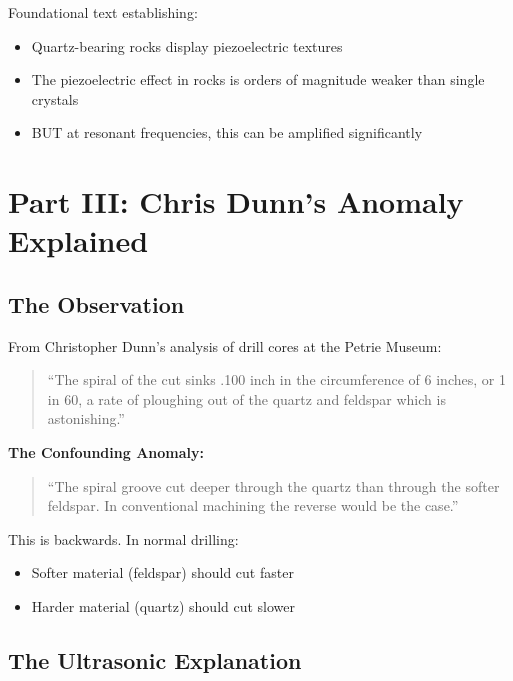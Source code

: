 \documentclass[11pt]{article}
\begin{document}
\subsubsection{\citet{Parkhomenko1971}}

Foundational text establishing:
\begin{itemize}
    \item Quartz-bearing rocks display piezoelectric textures
    \item The piezoelectric effect in rocks is orders of magnitude weaker than single crystals
    \item BUT at resonant frequencies, this can be amplified significantly
\end{itemize}

\section{Part III: Chris Dunn's Anomaly Explained}

\subsection{The Observation}

From Christopher Dunn's analysis of drill cores at the Petrie Museum:

\begin{quote}
``The spiral of the cut sinks .100 inch in the circumference of 6 inches, or 1 in 60, a rate of ploughing out of the quartz and feldspar which is astonishing.''
\end{quote}

\textbf{The Confounding Anomaly:}
\begin{quote}
``The spiral groove cut deeper through the quartz than through the softer feldspar. In conventional machining the reverse would be the case.''
\end{quote}

This is backwards. In normal drilling:
\begin{itemize}
    \item Softer material (feldspar) should cut faster
    \item Harder material (quartz) should cut slower
\end{itemize}

\subsection{The Ultrasonic Explanation}
\end{document}
